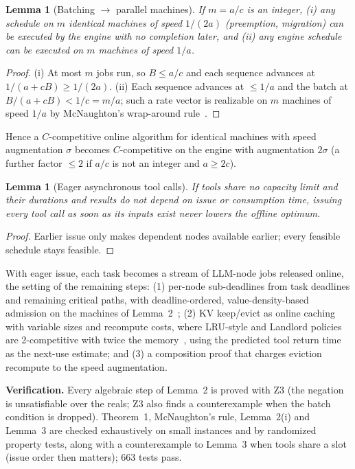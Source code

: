 \documentclass{article}
\newtheorem{lemma}[theorem]{Lemma}
\begin{document}
\begin{lemma}[Batching $\to$ parallel machines]
If $m=a/c$ is an integer, (i) any schedule on $m$ identical machines of speed $1/(2a)$ (preemption, migration)
can be executed by the engine with no completion later, and (ii) any engine schedule can be executed on $m$
machines of speed $1/a$.
\end{lemma}
\begin{proof}
(i) At most $m$ jobs run, so $B\le a/c$ and each sequence advances at $1/(a+cB)\ge1/(2a)$. (ii) Each sequence
advances at $\le1/a$ and the batch at $B/(a+cB)<1/c=m/a$; such a rate vector is realizable on $m$ machines of
speed $1/a$ by McNaughton's wrap-around rule~\cite{mcnaughton1959}.
\end{proof}
Hence a $C$-competitive online algorithm for identical machines with speed augmentation $\sigma$ becomes
$C$-competitive on the engine with augmentation $2\sigma$ (a further factor $\le2$ if $a/c$ is not an integer
and $a\ge2c$).

\begin{lemma}[Eager asynchronous tool calls]
If tools share no capacity limit and their durations and results do not depend on issue or consumption time,
issuing every tool call as soon as its inputs exist never lowers the offline optimum.
\end{lemma}
\begin{proof}
Earlier issue only makes dependent nodes available earlier; every feasible schedule stays feasible.
\end{proof}
With eager issue, each task becomes a stream of LLM-node jobs released online, the setting of the remaining
steps: (1) per-node sub-deadlines from task deadlines and remaining critical paths, with deadline-ordered,
value-density-based admission on the machines of Lemma~2~\cite{koren1995}; (2) KV keep/evict as online caching
with variable sizes and recompute costs, where LRU-style and Landlord policies are 2-competitive with twice the
memory~\cite{sleator1985,young2002}, using the predicted tool return time as the next-use estimate; and (3) a
composition proof that charges eviction recompute to the speed augmentation.

\textbf{Verification.} Every algebraic step of Lemma~2 is proved with Z3 (the negation is unsatisfiable over the
reals; Z3 also finds a counterexample when the batch condition is dropped). Theorem~1, McNaughton's rule,
Lemma~2(i) and Lemma~3 are checked exhaustively on small instances and by randomized property tests, along with
a counterexample to Lemma~3 when tools share a slot (issue order then matters); 663 tests pass.
\end{document}
